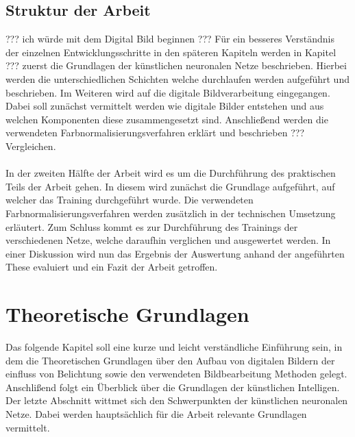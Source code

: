 \documentclass[a4paper,12pt,oneside]{article}
\begin{document}
  \subsection{Struktur der Arbeit}\label{Struktur}
??? ich würde mit dem Digital Bild beginnen ??? 
Für ein besseres Verständnis der einzelnen Entwicklungsschritte in den späteren Kapiteln werden in Kapitel ??? zuerst die Grundlagen der künstlichen neuronalen Netze beschrieben. Hierbei werden die unterschiedlichen Schichten welche durchlaufen werden aufgeführt und beschrieben. Im Weiteren wird auf die digitale Bildverarbeitung eingegangen. Dabei soll zunächst vermittelt werden wie digitale Bilder entstehen und aus welchen Komponenten diese zusammengesetzt sind. Anschließend werden die verwendeten Farbnormalisierungsverfahren erklärt und beschrieben ??? Vergleichen.\\\\
In der zweiten Hälfte der Arbeit wird es um die Durchführung des praktischen Teils der Arbeit gehen. In diesem wird zunächst die Grundlage aufgeführt, auf welcher das Training durchgeführt wurde. Die verwendeten Farbnormalisierungsverfahren werden zusätzlich in der technischen Umsetzung erläutert. Zum Schluss kommt es zur Durchführung des Trainings der verschiedenen Netze, welche daraufhin verglichen und ausgewertet werden. In einer Diskussion wird nun das Ergebnis der Auswertung anhand der angeführten These evaluiert und ein Fazit der Arbeit getroffen.
  \newpage
  \section{Theoretische Grundlagen}\label{s.grundlagen}
  Das folgende Kapitel soll eine kurze und leicht verständliche Einführung sein, in dem die Theoretischen Grundlagen über den Aufbau von digitalen Bildern der einfluss von Belichtung sowie den verwendeten Bildbearbeitung Methoden gelegt. Anschlißend folgt ein Überblick über die Grundlagen der künstlichen Intelligen. Der letzte Abschnitt wittmet sich den Schwerpunkten der künstlichen neuronalen Netze. Dabei werden hauptsächlich für die Arbeit relevante Grundlagen vermittelt. 
\end{document}
